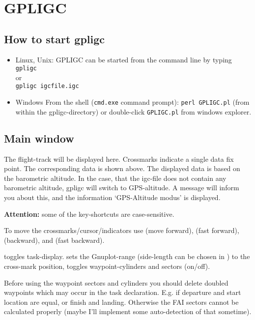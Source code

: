 \section{GPLIGC}

\subsection{How to start gpligc}

\begin{itemize}
\item{Linux, Unix:}
GPLIGC can be started from the command line by typing \\
\texttt{gpligc}\\
or\\
\texttt{gpligc  igcfile.igc}

\item{Windows}
From the shell (\texttt{cmd.exe} command prompt): \texttt{perl GPLIGC.pl} (from within the gpligc-directory)
or double-click \texttt{GPLIGC.pl} from windows explorer.

\end{itemize}

\subsection{Main window}
The flight-track will be displayed here.
Crossmarks indicate a single data fix point.
The corresponding data is shown above.
The displayed data is based on the barometric altitude.
In the case, that the igc-file does not contain any barometric altitude,
gpligc will switch to GPS-altitude.
A message will inform you about this, and
the information `GPS-Altitude modus' is displayed.

\textbf{Attention:} some of the key-shortcuts are case-sensitive.

To move the crossmarks/cursor/indicators use  (move forward),  (fast forward),  (backward), and  (fast backward).

 toggles task-display.
 sets the Gnuplot-range (side-length can be chosen in ) to the cross-mark position,
 toggles waypoint-cylinders and sectors (on/off).

Before using the waypoint sectors and cylinders you should delete doubled waypoints which may occur in the task declaration. E.g. if departure and start location are equal, or finish and landing.
Otherwise the FAI sectors cannot be calculated properly (maybe I'll implement some auto-detection of that sometime).

